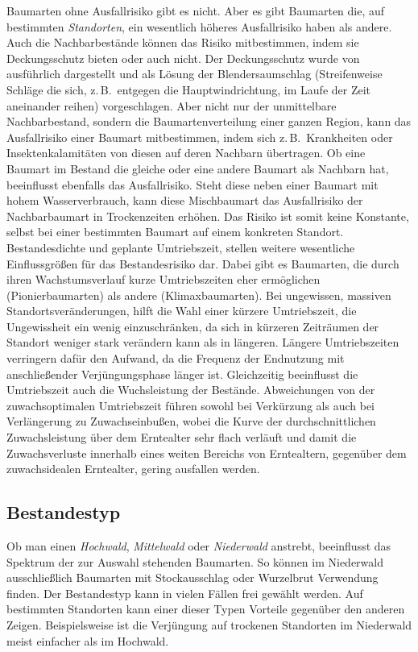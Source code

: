 \documentclass[twocolumn]{scrartcl}
\begin{document}
Baumarten ohne Ausfallrisiko gibt es nicht. Aber es gibt Baumarten
die, auf bestimmten \emph{Standorten}, ein wesentlich höheres
Ausfallrisiko haben als andere. Auch die Nachbarbestände können das
Risiko mitbestimmen, indem sie Deckungsschutz bieten oder auch nicht.
Der Deckungsschutz wurde von
\cite{wagner1923DerBlendersaumschlagUndSeinSystem} ausführlich
dargestellt und als Lösung der Blendersaumschlag (Streifenweise
Schläge die sich, z.\,B.\ entgegen die Hauptwindrichtung, im Laufe der
Zeit aneinander reihen) vorgeschlagen. Aber nicht nur der unmittelbare
Nachbarbestand, sondern die Baumartenverteilung einer ganzen Region,
kann das Ausfallrisiko einer Baumart mitbestimmen, indem sich z.\,B.\
Krankheiten oder Insektenkalamitäten von diesen auf deren Nachbarn
übertragen. Ob eine Baumart im Bestand die gleiche oder eine
andere Baumart als Nachbarn hat, beeinflusst ebenfalls das
Ausfallrisiko. Steht diese neben einer Baumart mit hohem
Wasserverbrauch, kann diese Mischbaumart das Ausfallrisiko der
Nachbarbaumart in Trockenzeiten erhöhen. Das Risiko ist somit keine
Konstante, selbst bei einer bestimmten Baumart auf einem konkreten
Standort. Bestandesdichte und geplante Umtriebszeit, stellen weitere
wesentliche Einflussgrößen für das Bestandesrisiko dar. Dabei gibt es
Baumarten, die durch ihren Wachstumsverlauf kurze Umtriebszeiten eher
ermöglichen (Pionierbaumarten) als andere (Klimaxbaumarten). Bei
ungewissen, massiven Standortsveränderungen, hilft die Wahl einer
kürzere Umtriebszeit, die Ungewissheit ein wenig einzuschränken, da
sich in kürzeren Zeiträumen der Standort weniger stark verändern kann
als in längeren. Längere Umtriebszeiten verringern dafür den Aufwand,
da die Frequenz der Endnutzung mit anschließender Verjüngungsphase
länger ist. Gleichzeitig beeinflusst die Umtriebszeit auch die
Wuchsleistung der Bestände. Abweichungen von der zuwachsoptimalen
Umtriebszeit führen sowohl bei Verkürzung als auch bei Verlängerung zu
Zuwachseinbußen, wobei die Kurve der durchschnittlichen Zuwachsleistung über dem Erntealter sehr flach verläuft und damit die Zuwachsverluste innerhalb eines weiten Bereichs von Erntealtern, gegenüber dem zuwachsidealen Erntealter, gering ausfallen werden.

\subsection{Bestandestyp}
\label{ssec:bestandestyp}

Ob man einen \emph{Hochwald}, \emph{Mittelwald} oder \emph{Niederwald}
anstrebt, beeinflusst das Spektrum der zur Auswahl stehenden
Baumarten. So können im Niederwald ausschließlich Baumarten mit
Stockausschlag oder Wurzelbrut Verwendung finden. Der Bestandestyp
kann in vielen Fällen frei gewählt werden. Auf bestimmten Standorten
kann einer dieser Typen Vorteile gegenüber den anderen
Zeigen. Beispielsweise ist die Verjüngung auf trockenen Standorten im
Niederwald meist einfacher als im Hochwald.
\end{document}
